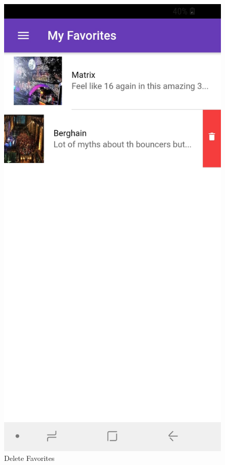 \documentclass[12pt]{article}
\begin{document}
\begin{figure}[H]
\endminipage\hfill
{}%
  \includegraphics[width=\linewidth]{figures/Favorites_delete.jpg}
  \caption{Delete Favorites}\label{fig:awesome_image3}
\endminipage
\end{figure}
\end{document}
